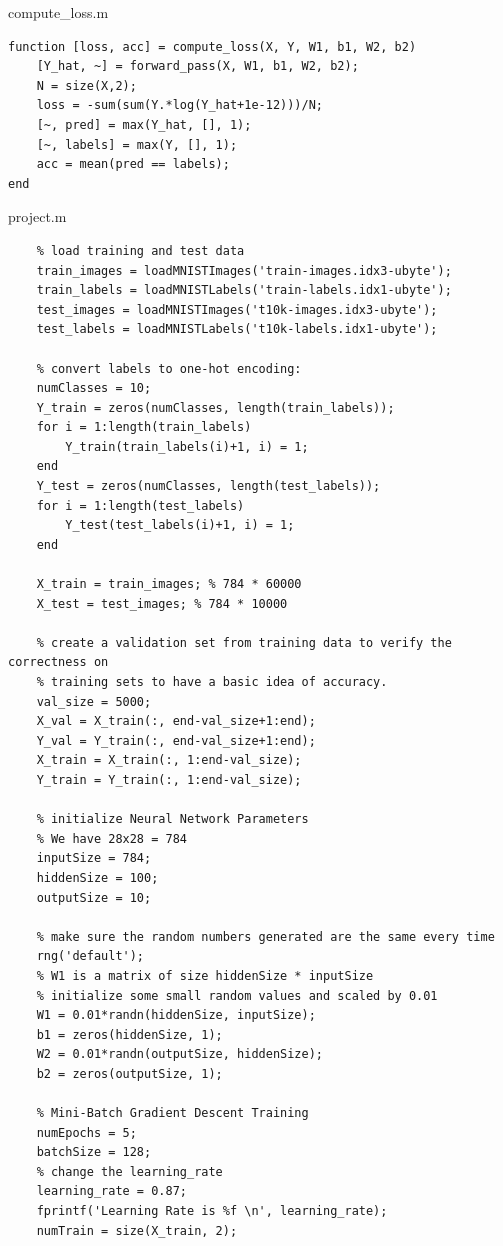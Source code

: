 \documentclass[fleqn]{rbfin}
\begin{document}
compute\_loss.m

\begin{lstlisting}
function [loss, acc] = compute_loss(X, Y, W1, b1, W2, b2)
    [Y_hat, ~] = forward_pass(X, W1, b1, W2, b2);
    N = size(X,2);
    loss = -sum(sum(Y.*log(Y_hat+1e-12)))/N;
    [~, pred] = max(Y_hat, [], 1);
    [~, labels] = max(Y, [], 1);
    acc = mean(pred == labels);
end
\end{lstlisting}

project.m
\begin{lstlisting}
    % load training and test data
    train_images = loadMNISTImages('train-images.idx3-ubyte');
    train_labels = loadMNISTLabels('train-labels.idx1-ubyte');
    test_images = loadMNISTImages('t10k-images.idx3-ubyte');
    test_labels = loadMNISTLabels('t10k-labels.idx1-ubyte');
    
    % convert labels to one-hot encoding:
    numClasses = 10;
    Y_train = zeros(numClasses, length(train_labels));
    for i = 1:length(train_labels)
        Y_train(train_labels(i)+1, i) = 1;
    end
    Y_test = zeros(numClasses, length(test_labels));
    for i = 1:length(test_labels)
        Y_test(test_labels(i)+1, i) = 1;
    end
    
    X_train = train_images; % 784 * 60000
    X_test = test_images; % 784 * 10000
    
    % create a validation set from training data to verify the correctness on 
    % training sets to have a basic idea of accuracy.
    val_size = 5000;
    X_val = X_train(:, end-val_size+1:end);
    Y_val = Y_train(:, end-val_size+1:end);
    X_train = X_train(:, 1:end-val_size);
    Y_train = Y_train(:, 1:end-val_size);
    
    % initialize Neural Network Parameters
    % We have 28x28 = 784
    inputSize = 784;
    hiddenSize = 100;
    outputSize = 10;
    
    % make sure the random numbers generated are the same every time
    rng('default');
    % W1 is a matrix of size hiddenSize * inputSize
    % initialize some small random values and scaled by 0.01
    W1 = 0.01*randn(hiddenSize, inputSize);
    b1 = zeros(hiddenSize, 1);
    W2 = 0.01*randn(outputSize, hiddenSize);
    b2 = zeros(outputSize, 1);
    
    % Mini-Batch Gradient Descent Training
    numEpochs = 5;
    batchSize = 128;
    % change the learning_rate
    learning_rate = 0.87;
    fprintf('Learning Rate is %f \n', learning_rate);
    numTrain = size(X_train, 2);
    

\end{lstlisting}
\end{document}
